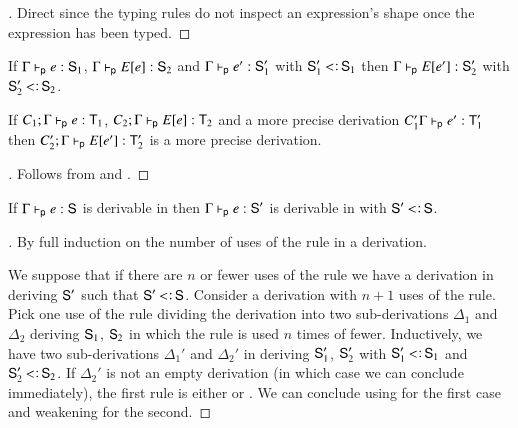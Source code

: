 \documentclass{report}
\begin{document}
  \begin{proof}[]
    Direct since the typing rules do not inspect an expression's shape
    once the expression has been typed.
  \end{proof}
  \begin{cor}
    If $\Gamma\vdash_\textsf{p} e:\textsf{S}_1$, $\Gamma\vdash_\textsf{p} E[e]:\textsf{S}_2$ and
    $\Gamma\vdash_\textsf{p} e':\textsf{S}_1'$ with $\type{S}_1'\subtype\type{S}_1$ then
    $\Gamma\vdash_\textsf{p} E[e']:\textsf{S}_2'$ with $\type{S}_2'\subtype\type{S}_2$.
    
    If $C_1;\Gamma\vdash_\textsf{p} e:\textsf{T}_1$, $C_2;\Gamma\vdash_\textsf{p} E[e]:\textsf{T}_2$ and
    a more precise derivation $C_1'\Gamma\vdash_\textsf{p} e':\textsf{T}_1'$ then
    $C_2';\Gamma\vdash_\textsf{p} E[e']:\textsf{T}_2'$ is a more precise derivation.
  \end{cor}
  \begin{proof}[]
    Follows from  and .
  \end{proof}
  \begin{thm}
    If $\Gamma\vdash_\textsf{p} e:\textsf{S}$ is derivable in \BQsa then
    $\Gamma\vdash_\textsf{p} e:\textsf{S}'$ is derivable in \BQa with $\type{S}'\subtype\type{S}$.
  \end{thm}
  \begin{proof}[]
    By full induction on the number of uses of the \decsub rule in a derivation.
    
    We suppose that if there are $n$ or fewer uses of the \decsub rule we have a derivation in
    \BQa deriving $\textsf{S}'$ such that $\type{S}'\subtype\type{S}$. Consider a derivation
    with $n+1$ uses of the \decsub rule. Pick one use of the \decsub rule dividing the derivation into
    two sub-derivations $\Delta_1$ and $\Delta_2$ deriving $\textsf{S}_1$, $\textsf{S}_2$
    in which the \decsub rule is used $n$ times of fewer.
    Inductively, we have two sub-derivations $\Delta_1'$ and $\Delta_2'$ in
    \BQa deriving $\textsf{S}_1'$, $\textsf{S}_2'$ with
    $\type{S}_1'\subtype\type{S}_1$ and $\type{S}_2'\subtype\type{S}_2$.
    If $\Delta_2'$ is not an empty derivation (in which case we can conclude immediately),
    the first rule is either \sdstart or \sdlet. We can conclude using 
    for the first case and weakening  for the second.
  \end{proof}
\end{document}

